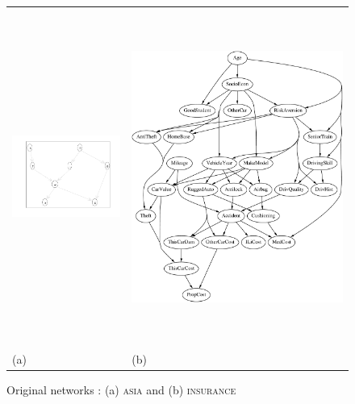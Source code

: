 \begin{figure}[!ht]
\centering\begin{tabular}{ll}\hspace*{1cm}
\begin{minipage}{6cm}
\hspace*{-195pt}\vspace*{-175pt}
 \includegraphics[width=55mm, height=52mm]{fig/asia2}
\end{minipage} & %
\hspace*{-240pt}
\begin{minipage}{6cm}
 \includegraphics[width=110mm, height=110mm]{fig/insurance}
\end{minipage}\\
\hspace*{-80pt}(a) & \hspace*{-80pt} (b)
\end{tabular}
\caption{Original networks : (a) \textsc{asia} and (b) \textsc{insurance}}
\label{orig}
\end{figure}

